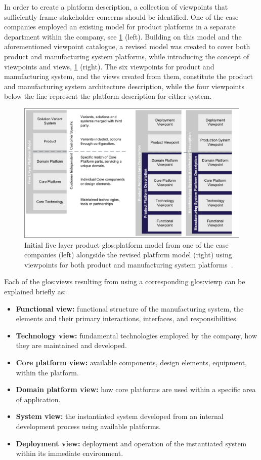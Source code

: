 In order to create a platform description, a collection of viewpoints that sufficiently frame stakeholder concerns should be identified.
One of the case companies employed an existing model for product platforms in a separate department within the company, see \cref{fig:FLPM} (left).
Building on this model and the aforementioned viewpoint catalogue, a revised model was created to cover both product and manufacturing system platforms, while introducing the concept of viewpoints and views, \cref{fig:FLPM} (right).
The six viewpoints for product and manufacturing system, and the views created from them, constitute the product and manufacturing system architecture description, while the four viewpoints below the line represent the platform description for either system.
\begin{figure}[tb]
  \centering
  \includegraphics[width=.9\textwidth, trim=2 2 2 2, clip]{mainmatter/researchResults/figures/FLPM.pdf}
  \caption[Five layer product platform model and revised platform model.]
  {Initial five layer product \gls{glos:platform} model from one of the case companies (left) alongside the revised platform model (right) using viewpoints for both product and manufacturing system platforms~\parencite{SorensenMCPC2017}.}\label{fig:FLPM}
\end{figure}
Each of the \gls{glos:view}s resulting from using a corresponding \gls{glos:viewp} can be explained briefly as:
\begin{itemize}
  \item \textbf{Functional view:} functional structure of the manufacturing system, the elements and their primary interactions, interfaces, and responsibilities.
  \item \textbf{Technology view:} fundamental technologies employed by the company, how they are maintained and developed.
  \item \textbf{Core platform view:} available components, design elements, equipment, \etc{} within the platform.
  \item \textbf{Domain platform view:} how core platforms are used within a specific area of application.
  \item \textbf{System view:} the instantiated system developed from an internal development process using available platforms.
  \item \textbf{Deployment view:} deployment and operation of the instantiated system within its immediate environment.
\end{itemize}

